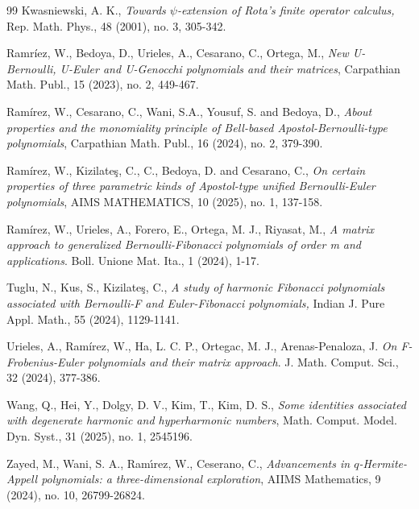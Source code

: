 \documentclass[12pt, a4paper]{article}
\begin{document}
\begin{thebibliography}{99}
 Kwasniewski, A. K., \textit{Towards  $\psi$-extension of Rota's finite operator calculus,} Rep. Math. Phys., 48 (2001), no. 3, 305-342.

 Ramr\'iez, W., Bedoya, D., Urieles, A., Cesarano, C., Ortega, M., \textit{New U-Bernoulli, U-Euler and U-Genocchi polynomials and their matrices}, Carpathian Math. Publ., 15 (2023), no. 2, 449-467.

 Ram\'irez, W., Cesarano, C., Wani, S.A., Yousuf, S. and Bedoya, D., \textit{About properties and the monomiality principle of Bell-based Apostol-Bernoulli-type polynomials}, Carpathian Math. Publ., 16 (2024), no. 2, 379-390.

 Ram\'irez, W., Kizilate\c{s}, C., C., Bedoya, D. and Cesarano, C., \textit{On certain properties of three parametric kinds of Apostol-type unified Bernoulli-Euler polynomials}, AIMS MATHEMATICS, 10 (2025), no. 1, 137-158.

 Ram\'irez, W., Urieles, A., Forero, E., Ortega, M. J., Riyasat, M., \textit{A matrix approach to generalized Bernoulli-Fibonacci polynomials of order m and applications}. Boll. Unione Mat. Ita., 1 (2024), 1-17.


 Tuglu, N., Kus, S., Kizilate\c{s}, C., \textit{A study of harmonic Fibonacci polynomials associated with Bernoulli-F and Euler-Fibonacci polynomials,} Indian J. Pure Appl. Math., 55 (2024), 1129-1141.

 Urieles, A., Ram\'irez, W., Ha, L. C. P., Ortegac, M. J., Arenas-Penaloza, J. \textit{On F-Frobenius-Euler polynomials and their matrix approach}. J. Math. Comput. Sci., 32 (2024), 377-386.

 Wang, Q., Hei, Y., Dolgy, D. V., Kim, T., Kim, D. S., \textit{Some identities associated with degenerate harmonic and hyperharmonic numbers}, Math. Comput. Model.
Dyn. Syst., 31 (2025), no. 1, 2545196.

 Zayed, M., Wani, S. A.,  Ram\'{\i}rez, W., Ceserano, C., \textit{Advancements in
$q$-Hermite-Appell polynomials: a three-dimensional exploration}, AIIMS Mathematics, 9 (2024), no. 10,  26799-26824.

\end{thebibliography}
\end{document}
